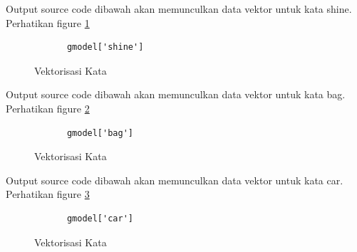 \begin{enumerate}
Output source code dibawah akan memunculkan data vektor untuk kata shine. Perhatikan figure \ref{YNC5-11}

		\begin{verbatim}
			gmodel['shine']
		\end{verbatim}

		\begin{figure}[!htbp]
			\caption{Vektorisasi Kata}
			\label{YNC5-11}
		\end{figure}

Output source code dibawah akan memunculkan data vektor untuk kata bag. Perhatikan figure \ref{YNC5-12}

		\begin{verbatim}
			gmodel['bag']
		\end{verbatim}

		\begin{figure}[!htbp]
			\caption{Vektorisasi Kata}
			\label{YNC5-12}
		\end{figure}

Output source code dibawah akan memunculkan data vektor untuk kata car. Perhatikan figure \ref{YNC5-13}

		\begin{verbatim}
			gmodel['car']
		\end{verbatim}

		\begin{figure}[!htbp]
			\caption{Vektorisasi Kata}
			\label{YNC5-13}
		\end{figure}


\end{enumerate}
